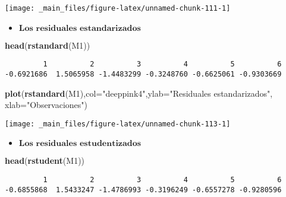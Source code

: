 \documentclass[
  a4paper,
  oneside,
  openany]{book}
\newenvironment{Shaded}{\begin{snugshade}}{\end{snugshade}}
\newcommand{\DataTypeTok}[1]{\textcolor[rgb]{0.13,0.29,0.53}{#1}}
\newcommand{\KeywordTok}[1]{\textcolor[rgb]{0.13,0.29,0.53}{\textbf{#1}}}
\newcommand{\NormalTok}[1]{#1}
\newcommand{\StringTok}[1]{\textcolor[rgb]{0.31,0.60,0.02}{#1}}
\providecommand{\tightlist}{%
  \setlength{\itemsep}{0pt}\setlength{\parskip}{0pt}}
\begin{document}
\begin{center}\texttt{[image: \_main\_files/figure-latex/unnamed-chunk-111-1]} \end{center}

\begin{itemize}
\tightlist
\item
  \(\textbf{Los residuales estandarizados}\)
\end{itemize}

\begin{Shaded}
\begin{Highlighting}[]
\KeywordTok{head}\NormalTok{(}\KeywordTok{rstandard}\NormalTok{(M1))}
\end{Highlighting}
\end{Shaded}

\begin{verbatim}
         1          2          3          4          5          6 
-0.6921686  1.5065958 -1.4483299 -0.3248760 -0.6625061 -0.9303669 
\end{verbatim}

\begin{Shaded}
\begin{Highlighting}[]
\KeywordTok{plot}\NormalTok{(}\KeywordTok{rstandard}\NormalTok{(M1),}\DataTypeTok{col=}\StringTok{"deeppink4"}\NormalTok{,}\DataTypeTok{ylab=}\StringTok{"Residuales estandarizados"}\NormalTok{, }\DataTypeTok{xlab=}\StringTok{"Observaciones"}\NormalTok{)}
\end{Highlighting}
\end{Shaded}

\begin{center}\texttt{[image: \_main\_files/figure-latex/unnamed-chunk-113-1]} \end{center}

\begin{itemize}
\tightlist
\item
  \(\textbf{Los residuales estudentizados}\)
\end{itemize}

\begin{Shaded}
\begin{Highlighting}[]
\KeywordTok{head}\NormalTok{(}\KeywordTok{rstudent}\NormalTok{(M1))}
\end{Highlighting}
\end{Shaded}

\begin{verbatim}
         1          2          3          4          5          6 
-0.6855868  1.5433247 -1.4786993 -0.3196249 -0.6557278 -0.9280596 
\end{verbatim}
\end{document}
